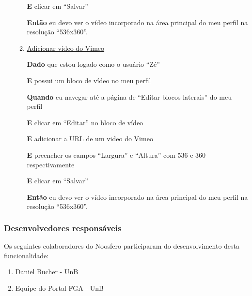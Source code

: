 \begin{enumerate}
\begin{enumerate}
\textbf{E} clicar em ``Salvar''

\textbf{Então} eu devo ver o vídeo incorporado na área principal do meu
perfil na resolução ``536x360''.



\item \underline{Adicionar vídeo do Vimeo}

\textbf{Dado} que estou logado como o usuário ``Zé''

\textbf{E} possui um bloco de vídeo no meu perfil

\textbf{Quando} eu navegar até a página de ``Editar blocos laterais'' do meu perfil

\textbf{E} clicar em ``Editar'' no bloco de vídeo

\textbf{E} adicionar a URL de um video do Vimeo

\textbf{E} preencher os campos ``Largura'' e ``Altura'' com 536 e 360
respectivamente

\textbf{E} clicar em ``Salvar''

\textbf{Então} eu devo ver o vídeo incorporado na área principal do meu
perfil na resolução ``536x360''.

\end{enumerate}

\end{enumerate}

\subsubsection*{Desenvolvedores responsáveis}

Os seguintes colaboradores do Noosfero participaram do desenvolvimento desta
funcionalidade:

\begin{enumerate}

\item Daniel Bucher - UnB

\item Equipe do Portal FGA - UnB

\end{enumerate}


